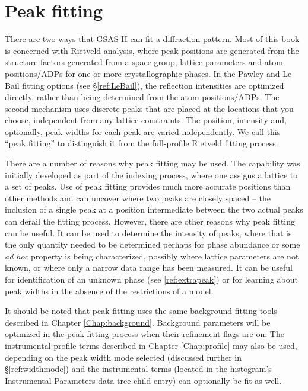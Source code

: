 \chapter{Peak fitting}\label{Chap:peakfitting}

There are two ways that GSAS-II can fit a diffraction pattern. Most of this book is concerned with Rietveld analysis, where peak positions are generated from the structure factors generated from a space group, lattice parameters and atom positions/ADPs for one or more crystallographic phases. In the Pawley and Le Bail fitting options (see \S\ref{ref:LeBail}), the reflection intensities are optimized directly, rather than being determined from the atom positions/ADPs. The second mechanism uses discrete peaks that are placed at the locations that you choose, independent from any lattice constraints. The position, intensity and, optionally, peak widths for each peak are varied independently. We call this ``peak fitting'' to distinguish it from the full-profile Rietveld fitting process. 

There are a number of reasons why peak fitting may be used. The capability was initially developed as part of the indexing process, where one assigns a lattice to a set of peaks. Use of peak fitting provides much more accurate positions than other methods and can uncover where two peaks are closely spaced -- the inclusion of a single peak at a position intermediate between the two actual peaks can derail the fitting process. However, there are other reasons why peak fitting can be useful. It can be used to determine the intensity of peaks, where that is the only quantity needed to be determined perhaps for phase abundance or some \textit{ad hoc} property is being characterized, possibly where lattice parameters are not known, or where only a narrow data range has been measured. It can be useful for identification of an unknown phase (see \ref{ref:extrapeak}) or for learning about peak widths in the absence of the restrictions of a model. 

It should be noted that peak fitting uses the same background fitting tools described in Chapter \ref{Chap:background}. Background parameters will be optimized in the peak fitting process when their refinement flags are on. The instrumental profile terms described in Chapter \ref{Chap:profile} may also be used, depending on the peak width mode selected (discussed further in \S\ref{ref:widthmode}) and the instrumental terms (located in the histogram's Instrumental Parameters data tree child entry) can optionally be fit as well. 

